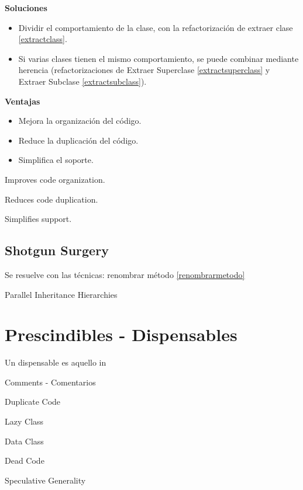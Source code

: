 \documentclass[11pt,a4paper,oneside]{book}
\begin{document}
\textbf{Soluciones}
\begin{itemize}
    \item Dividir el comportamiento de la clase, con la refactorización de extraer clase \ref{extractclass}.
    \item Si varias clases tienen el mismo comportamiento, se puede combinar mediante herencia (refactorizaciones de Extraer Superclase \ref{extractsuperclass} y Extraer Subclase \ref{extractsubclass}).
\end{itemize}
\newline
\textbf{Ventajas}
\begin{itemize}
    \item Mejora la organización del código.
    \item Reduce la duplicación del código.
    \item Simplifica el soporte.
\end{itemize}
    
    
Improves code organization.

Reduces code duplication.

Simplifies support.

\subsection{    Shotgun Surgery}

Se resuelve con las técnicas: renombrar método \ref{renombrarmetodo}

    Parallel Inheritance Hierarchies



\section{Prescindibles - Dispensables}


Un dispensable es aquello in


    Comments - Comentarios
    
    Duplicate Code
    
    Lazy Class

    Data Class

Dead Code

    Speculative Generality
\end{document}
